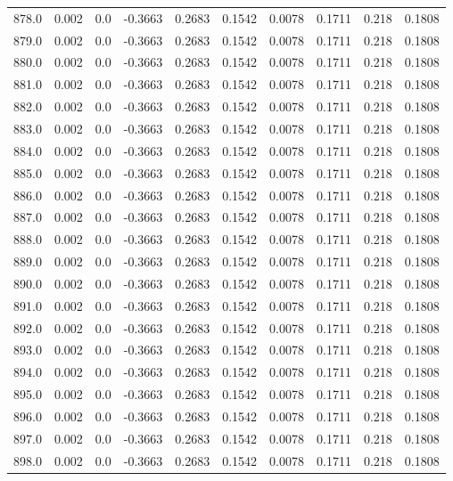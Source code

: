 \begin{longtable}{lrrrrrrrrr}
878.0 & 0.002 & 0.0 & -0.3663 & 0.2683 & 0.1542 & 0.0078 & 0.1711 & 0.218 & 0.1808 \\
879.0 & 0.002 & 0.0 & -0.3663 & 0.2683 & 0.1542 & 0.0078 & 0.1711 & 0.218 & 0.1808 \\
880.0 & 0.002 & 0.0 & -0.3663 & 0.2683 & 0.1542 & 0.0078 & 0.1711 & 0.218 & 0.1808 \\
881.0 & 0.002 & 0.0 & -0.3663 & 0.2683 & 0.1542 & 0.0078 & 0.1711 & 0.218 & 0.1808 \\
882.0 & 0.002 & 0.0 & -0.3663 & 0.2683 & 0.1542 & 0.0078 & 0.1711 & 0.218 & 0.1808 \\
883.0 & 0.002 & 0.0 & -0.3663 & 0.2683 & 0.1542 & 0.0078 & 0.1711 & 0.218 & 0.1808 \\
884.0 & 0.002 & 0.0 & -0.3663 & 0.2683 & 0.1542 & 0.0078 & 0.1711 & 0.218 & 0.1808 \\
885.0 & 0.002 & 0.0 & -0.3663 & 0.2683 & 0.1542 & 0.0078 & 0.1711 & 0.218 & 0.1808 \\
886.0 & 0.002 & 0.0 & -0.3663 & 0.2683 & 0.1542 & 0.0078 & 0.1711 & 0.218 & 0.1808 \\
887.0 & 0.002 & 0.0 & -0.3663 & 0.2683 & 0.1542 & 0.0078 & 0.1711 & 0.218 & 0.1808 \\
888.0 & 0.002 & 0.0 & -0.3663 & 0.2683 & 0.1542 & 0.0078 & 0.1711 & 0.218 & 0.1808 \\
889.0 & 0.002 & 0.0 & -0.3663 & 0.2683 & 0.1542 & 0.0078 & 0.1711 & 0.218 & 0.1808 \\
890.0 & 0.002 & 0.0 & -0.3663 & 0.2683 & 0.1542 & 0.0078 & 0.1711 & 0.218 & 0.1808 \\
891.0 & 0.002 & 0.0 & -0.3663 & 0.2683 & 0.1542 & 0.0078 & 0.1711 & 0.218 & 0.1808 \\
892.0 & 0.002 & 0.0 & -0.3663 & 0.2683 & 0.1542 & 0.0078 & 0.1711 & 0.218 & 0.1808 \\
893.0 & 0.002 & 0.0 & -0.3663 & 0.2683 & 0.1542 & 0.0078 & 0.1711 & 0.218 & 0.1808 \\
894.0 & 0.002 & 0.0 & -0.3663 & 0.2683 & 0.1542 & 0.0078 & 0.1711 & 0.218 & 0.1808 \\
895.0 & 0.002 & 0.0 & -0.3663 & 0.2683 & 0.1542 & 0.0078 & 0.1711 & 0.218 & 0.1808 \\
896.0 & 0.002 & 0.0 & -0.3663 & 0.2683 & 0.1542 & 0.0078 & 0.1711 & 0.218 & 0.1808 \\
897.0 & 0.002 & 0.0 & -0.3663 & 0.2683 & 0.1542 & 0.0078 & 0.1711 & 0.218 & 0.1808 \\
898.0 & 0.002 & 0.0 & -0.3663 & 0.2683 & 0.1542 & 0.0078 & 0.1711 & 0.218 & 0.1808 \\

\end{longtable}
